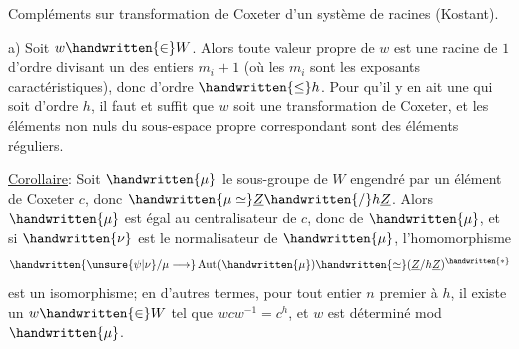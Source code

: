 Compléments sur transformation de Coxeter d'un système de racines (Kostant).

a) Soit $w\handwritten{\in}W$. Alors toute valeur propre de $w$ est une racine de $1$ d'ordre divisant un des entiers $m_i+1$ (où les $m_i$ sont les exposants caractéristiques), donc d'ordre $\handwritten{\leq}h$. Pour qu'il y en ait une qui soit d'ordre $h$, il faut et suffit que $w$ soit une transformation de Coxeter, et les éléments non nuls du sous-espace propre correspondant sont des éléments réguliers.

\uline{Corollaire}: Soit $\handwritten{\mu}$ le sous-groupe de $W$ engendré par un élément de Coxeter $c$, donc $\handwritten{\mu\simeq}\underline{Z}\handwritten{/}h\underline{Z}$. Alors $\handwritten{\mu}$ est égal au centralisateur de $c$, donc de $\handwritten{\mu}$, et si $\handwritten{\nu}$ est le normalisateur de $\handwritten{\mu}$, l'homomorphisme
\[
\handwritten{\unsure{\psi|\nu}/\mu\longrightarrow}\operatorname{Aut}(\handwritten{\mu})\handwritten{\simeq}(\underline{Z}/h\underline{Z})^{\handwritten{*}}
\]
\margin{\handwritten{Quelle extension de $(\unsure{Z|\mathbb{Z}}/hZ]^{*}$ par $Z/hZ$ obtient-on ?}}
est un isomorphisme; en d'autres termes, pour tout entier $n$ premier à $h$, il existe un $w\handwritten{\in}W$ tel que $wcw^{-1}=c^h$, et $w$ est déterminé mod $\handwritten{\mu}$.


